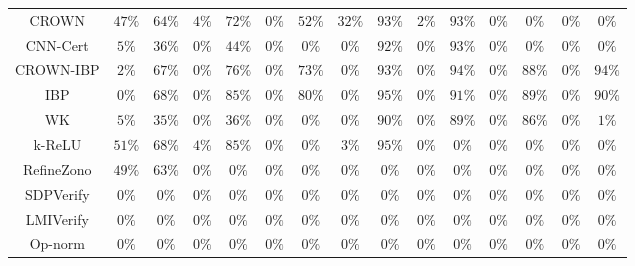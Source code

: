 \begin{table*}
{\begin{tabular}{c|c|c|c|c|c|c|c|c|c|c|c|c|c|c}
        CROWN &        $47\%$ &        $64\%$ &         $4\%$ &        $72\%$ &         $0\%$ &        $52\%$ &        $32\%$ &        $93\%$ &         $2\%$ &        $93\%$ &         $0\%$ &         $0\%$ &         $0\%$ &         $0\%$ \\
     CNN-Cert &         $5\%$ &        $36\%$ &         $0\%$ &        $44\%$ &         $0\%$ &         $0\%$ &         $0\%$ &        $92\%$ &         $0\%$ &        $93\%$ &         $0\%$ &         $0\%$ &         $0\%$ &         $0\%$ \\
    CROWN-IBP &         $2\%$ &        $67\%$ &         $0\%$ &        $76\%$ &         $0\%$ &        $73\%$ &         $0\%$ &        $93\%$ &         $0\%$ &        $94\%$ &         $0\%$ &        $88\%$ &         $0\%$ &        $94\%$ \\
          IBP &         $0\%$ &        $68\%$ &         $0\%$ &        $85\%$ &         $0\%$ &        $80\%$ &         $0\%$ &        $95\%$ &         $0\%$ &        $91\%$ &         $0\%$ &        $89\%$ &         $0\%$ &        $90\%$ \\
           WK &         $5\%$ &        $35\%$ &         $0\%$ &        $36\%$ &         $0\%$ &         $0\%$ &         $0\%$ &        $90\%$ &         $0\%$ &        $89\%$ &         $0\%$ &        $86\%$ &         $0\%$ &         $1\%$ \\
       k-ReLU &        $51\%$ &        $68\%$ &         $4\%$ &        $85\%$ &         $0\%$ &         $0\%$ &         $3\%$ &        $95\%$ &         $0\%$ &         $0\%$ &         $0\%$ &         $0\%$ &         $0\%$ &         $0\%$ \\
   RefineZono &        $49\%$ &        $63\%$ &         $0\%$ &         $0\%$ &         $0\%$ &         $0\%$ &         $0\%$ &         $0\%$ &         $0\%$ &         $0\%$ &         $0\%$ &         $0\%$ &         $0\%$ &         $0\%$ \\
    SDPVerify &         $0\%$ &         $0\%$ &         $0\%$ &         $0\%$ &         $0\%$ &         $0\%$ &         $0\%$ &         $0\%$ &         $0\%$ &         $0\%$ &         $0\%$ &         $0\%$ &         $0\%$ &         $0\%$ \\
    LMIVerify &         $0\%$ &         $0\%$ &         $0\%$ &         $0\%$ &         $0\%$ &         $0\%$ &         $0\%$ &         $0\%$ &         $0\%$ &         $0\%$ &         $0\%$ &         $0\%$ &         $0\%$ &         $0\%$ \\
      Op-norm &         $0\%$ &         $0\%$ &         $0\%$ &         $0\%$ &         $0\%$ &         $0\%$ &         $0\%$ &         $0\%$ &         $0\%$ &         $0\%$ &         $0\%$ &         $0\%$ &         $0\%$ &         $0\%$ \\

\end{tabular}}
\end{table*}
